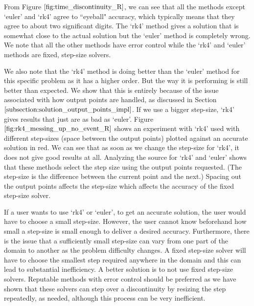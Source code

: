From Figure $\ref{fig:time_discontinuity_R}$, we can see that all the methods except `euler' and `rk4' agree to ``eyeball" accuracy, which typically means that they agree to about two significant digits. The `rk4' method gives a solution that is somewhat close to the actual solution but the `euler' method is completely wrong. We note that all the other methods have error control while the `rk4' and `euler' methods are fixed, step-size solvers.

We also note that the `rk4' method is doing better than the `euler' method for this specific problem as it has a higher order. But the way it is performing is still better than expected. We show that this is entirely because of the issue associated with how output points are handled, as discussed in Section $\ref{subsection:solution_output_points_impl}$. If we use a bigger step-size, `rk4' gives results that just are as bad as `euler'. Figure $\ref{fig:rk4_messing_up_no_event_R}$ shows an experiment with `rk4' used with different step-sizes (space between the output points) plotted against an accurate solution in red. We can see that as soon as we change the step-size for `rk4', it does not give good results at all. Analyzing the source for `rk4' and `euler' shows that these methods select the step size using the output points requested. (The step-size is the difference between the current point and the next.) Spacing out the output points affects the step-size which affects the accuracy of the fixed step-size solver.

If a user wants to use `rk4' or `euler', to get an accurate solution, the user would have to choose a small step-size. However, the user cannot know beforehand how small a step-size is small enough to deliver a desired accuracy. Furthermore, there is the issue that a sufficiently small step-size can vary from one part of the domain to another as the problem difficulty changes. A fixed step-size solver will have to choose the smallest step required anywhere in the domain and this can lead to substantial inefficiency. A better solution is to not use fixed step-size solvers. Reputable methods with error control should be preferred as we have shown that these solvers can step over a discontinuity by resizing the step repeatedly, as needed, although this process can be very inefficient.

